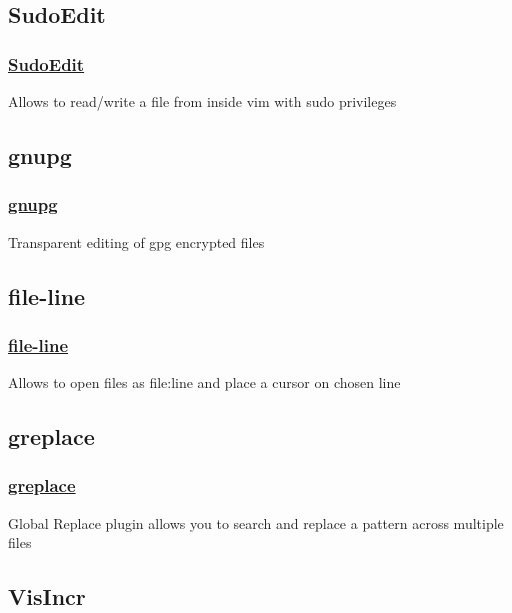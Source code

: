 \documentclass[14pt,svgnames,compress]{beamer}
\newcommand\hl[1]{\textcolor{HlColor}{#1}}
\begin{document}
\subsection{SudoEdit}

\begin{frame}
    \frametitle{
        \href{https://github.com/vim-scripts/SudoEdit.vim}
             {SudoEdit}
    }
    \large
    Allows to read/write a file from inside vim with \hl{sudo} privileges \\
\end{frame}


\subsection{gnupg}

\begin{frame}
    \frametitle{
        \href{https://github.com/vim-scripts/gnupg}
             {gnupg}
    }
    \large
    Transparent editing of \hl{gpg} encrypted files \\
\end{frame}


\subsection{file-line}

\begin{frame}
    \frametitle{
        \href{https://github.com/vim-scripts/file-line}
             {file-line}
    }
    \large
    Allows to open files as \hl{file:line} and place a cursor on chosen line \\
\end{frame}


\subsection{greplace}

\begin{frame}
    \frametitle{
        \href{https://github.com/vim-scripts/greplace.vim}
             {greplace}
    }
    \large
    Global Replace plugin allows you to search and replace a pattern across
    multiple files \\
\end{frame}


\subsection{VisIncr}
\end{document}

